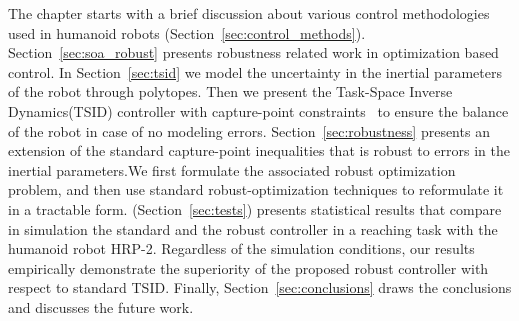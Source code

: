 The chapter starts with a brief discussion about various control methodologies used in humanoid robots (Section~\ref{sec:control_methods}). Section~\ref{sec:soa_robust} presents robustness related work in optimization based control. In Section~\ref{sec:tsid} we model the uncertainty in the inertial parameters of the robot through polytopes. Then we present the Task-Space Inverse Dynamics(TSID) controller with capture-point constraints~\cite{Ramos2014a} to ensure the balance of the robot in case of no modeling errors. Section~\ref{sec:robustness} presents an extension of the standard capture-point inequalities that is robust to errors in the inertial parameters.We first formulate the associated robust optimization problem, and then use standard robust-optimization techniques to reformulate it in a tractable form. (Section~\ref{sec:tests}) presents statistical results that compare in simulation the standard and the robust controller in a reaching task with the humanoid robot HRP-2. Regardless of the simulation conditions, our results empirically demonstrate the superiority of the proposed robust controller with respect to standard TSID. Finally, Section~\ref{sec:conclusions} draws the conclusions and discusses the future work.

